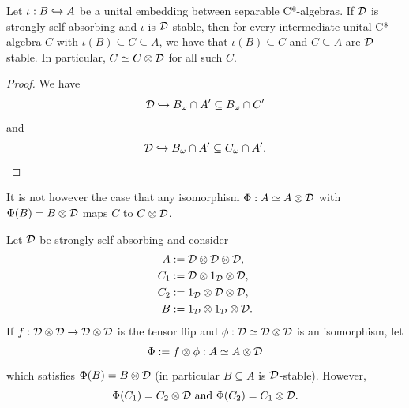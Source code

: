 \documentclass[12pt]{amsart}
\begin{document}
         \begin{cor}
           Let $\iota: B \hookrightarrow A$ be a unital embedding between separable C*-algebras. If $\mathcal{D}$ is strongly self-absorbing and $\iota$ is $\mathcal{D}$-stable, then for every intermediate unital C*-algebra $C$ with $\iota(B) \subseteq C \subseteq A$, we have that $\iota(B) \subseteq C$ and $C \subseteq A$ are $\mathcal{D}$-stable. In particular, $C \simeq C \otimes \mathcal{D}$ for all such $C$. 
           \begin{proof}
           We have
           \begin{equation}
           \mathcal{D} \hookrightarrow B_\omega \cap A' \subseteq B_\omega \cap C'
           \end{equation}
           and
           \begin{equation}
           \mathcal{D} \hookrightarrow B_\omega \cap A' \subseteq C_\omega \cap A'.
           \end{equation}
           \end{proof}
         \end{cor}

         It is not however the case that any isomorphism $\Phi: A \simeq A \otimes \mathcal{D}$ with $\Phi(B) = B \otimes \mathcal{D}$ maps $C$ to $C \otimes \mathcal{D}$.

         \begin{example}\label{noteveryintermediate}
             Let $\mathcal{D}$ be strongly self-absorbing and consider
\begin{equation}
\begin{split}
                 A &:= \mathcal{D} \otimes \mathcal{D} \otimes \mathcal{D}, \\
                 C_1 &:= \mathcal{D} \otimes 1_{\mathcal{D}} \otimes \mathcal{D},\\
                 C_2 &:= 1_{\mathcal{D}} \otimes \mathcal{D} \otimes \mathcal{D},\\
                 B &:= 1_{\mathcal{D}} \otimes 1_{\mathcal{D}} \otimes \mathcal{D}.
\end{split}
\end{equation}
               If $f: \mathcal{D} \otimes \mathcal{D} \to \mathcal{D} \otimes \mathcal{D}$ is the tensor flip and $\phi: \mathcal{D} \simeq \mathcal{D} \otimes \mathcal{D}$ is an isomorphism, let
\begin{equation}
                \Phi := f \otimes \phi: A \simeq A \otimes \mathcal{D}
\end{equation}
               which satisfies $\Phi(B) = B \otimes \mathcal{D}$ (in particular $B \subseteq A$ is $\mathcal{D}$-stable). However,
\begin{equation}
               \Phi(C_1) = C_2 \otimes \mathcal{D} \text{ and  } \Phi(C_2) = C_1 \otimes \mathcal{D}.
\end{equation}
           \end{example}
\end{document}
